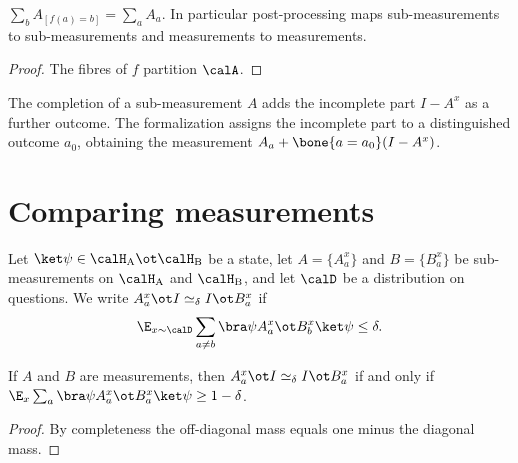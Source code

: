 \begin{proposition}\label{prop:post-processing-preserves}
	\leanok
	$\sum_bA_{[f(a)=b]}=\sum_aA_a$.  In particular post-processing maps
	sub-measurements to sub-measurements and measurements to measurements.
\end{proposition}
\begin{proof}
	\leanok
	The fibres of $f$ partition $\calA$.
\end{proof}

\begin{definition}\label{def:measurement-completion}
	\leanok
	The completion of a sub-measurement $A$ adds the incomplete part
	$I-A^x$ as a further outcome.  The formalization assigns the incomplete
	part to a distinguished outcome $a_0$, obtaining the measurement
	$A_a+\bone{a=a_0}(I-A^x)$.
\end{definition}

\section{Comparing measurements}
\label{sec:comparing-measurements}

\begin{definition}[Consistency]\label{def:simeq}
	\leanok
	Let $\ket\psi\in\calH_{\mathrm A}\ot\calH_{\mathrm B}$ be a state, let
	$A=\{A^x_a\}$ and $B=\{B^x_a\}$ be sub-measurements on
	$\calH_{\mathrm A}$ and $\calH_{\mathrm B}$, and let $\calD$ be a
	distribution on questions.  We write $A^x_a\ot I\simeq_\delta I\ot B^x_a$
	if
	\[
		\E_{x\sim\calD}\sum_{a\ne b}\bra\psi A^x_a\ot B^x_b\ket\psi\le\delta.
	\]
\end{definition}

\begin{proposition}\label{prop:simeq-for-measurements}
	\leanok
	If $A$ and $B$ are measurements, then $A^x_a\ot I\simeq_\delta I\ot B^x_a$
	if and only if
	$\E_x\sum_a\bra\psi A^x_a\ot B^x_a\ket\psi\ge1-\delta$.
\end{proposition}
\begin{proof}
	\leanok
	By completeness the off-diagonal mass equals one minus the diagonal mass.
\end{proof}

